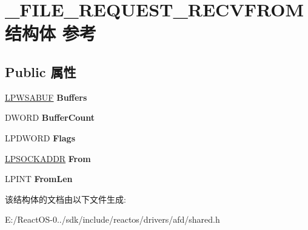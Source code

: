 \hypertarget{struct___f_i_l_e___r_e_q_u_e_s_t___r_e_c_v_f_r_o_m}{}\section{\+\_\+\+F\+I\+L\+E\+\_\+\+R\+E\+Q\+U\+E\+S\+T\+\_\+\+R\+E\+C\+V\+F\+R\+O\+M结构体 参考}
\label{struct___f_i_l_e___r_e_q_u_e_s_t___r_e_c_v_f_r_o_m}
\subsection*{Public 属性}
\begin{DoxyCompactItemize}
\item 
\mbox{\label{struct___f_i_l_e___r_e_q_u_e_s_t___r_e_c_v_f_r_o_m_a0081bb7dad20b8ec7cbea45760f0d533}} 
\hyperlink{struct___w_s_a_b_u_f}{L\+P\+W\+S\+A\+B\+UF} {\bfseries Buffers}
\item 
\mbox{\label{struct___f_i_l_e___r_e_q_u_e_s_t___r_e_c_v_f_r_o_m_aa5770c35bd41d682c90f9bcda619ed17}} 
D\+W\+O\+RD {\bfseries Buffer\+Count}
\item 
\mbox{\label{struct___f_i_l_e___r_e_q_u_e_s_t___r_e_c_v_f_r_o_m_ab9d4beefbfc8888dafc8467c0b3aeaa5}} 
L\+P\+D\+W\+O\+RD {\bfseries Flags}
\item 
\mbox{\label{struct___f_i_l_e___r_e_q_u_e_s_t___r_e_c_v_f_r_o_m_a4460b5247cf9c1dcba2a2ca6115c715d}} 
\hyperlink{structsockaddr}{L\+P\+S\+O\+C\+K\+A\+D\+DR} {\bfseries From}
\item 
\mbox{\label{struct___f_i_l_e___r_e_q_u_e_s_t___r_e_c_v_f_r_o_m_abf4c0c7ec3531eeeeed0f99eb174cc5d}} 
L\+P\+I\+NT {\bfseries From\+Len}
\end{DoxyCompactItemize}


该结构体的文档由以下文件生成\+:\begin{DoxyCompactItemize}
\item 
E\+:/\+React\+O\+S-\/0../sdk/include/reactos/drivers/afd/shared.\+h\end{DoxyCompactItemize}
